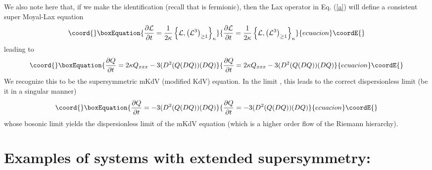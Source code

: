 \documentclass[a4paper,11pt]{article}
\begin{document}
We also note here that, if we make the identification \coordHE{}
(recall that \coordHE{} is fermionic), then the Lax operator in Eq. (\ref{a})
will define a consistent super Moyal-Lax equation
\begin{equation}\coord{}\boxEquation{
{\partial {\cal L}\over \partial t} = {1\over 2\kappa} \left\{{\cal
L}, \left({\cal L}^{3}\right)_{\geq 1}\right\}_{\kappa}
}{
{\partial {\cal L}\over \partial t} = {1\over 2\kappa} \left\{{\cal
L}, \left({\cal L}^{3}\right)_{\geq 1}\right\}_{\kappa}
}{ecuacion}\coordE{}\end{equation}
leading to
\begin{equation}\coord{}\boxEquation{
{\partial Q\over \partial t} = 2\kappa Q_{xxx} - 3 (D^{2}(Q(DQ)) (DQ)
}{
{\partial Q\over \partial t} = 2\kappa Q_{xxx} - 3 (D^{2}(Q(DQ)) (DQ)
}{ecuacion}\coordE{}\end{equation}
We recognize this to be the \coordHE{} supersymmetric mKdV (modified KdV)
equation. In the limit \coordHE{}, this leads to the
correct dispersionless limit (be it in a singular manner)
\begin{equation}\coord{}\boxEquation{
{\partial Q\over \partial t} = - 3 (D^{2}(Q(DQ)) (DQ)
}{
{\partial Q\over \partial t} = - 3 (D^{2}(Q(DQ)) (DQ)
}{ecuacion}\coordE{}\end{equation}
whose bosonic limit yields the dispersionless limit of the mKdV
equation (which is a higher order flow of the Riemann hierarchy).  

\section{Examples of systems with extended supersymmetry:}
\medskip
\end{document}
